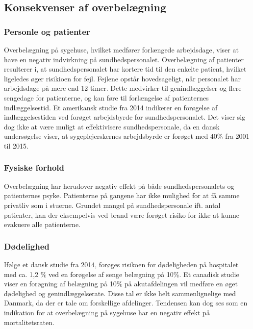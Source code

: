 \subsection{Konsekvenser af overbelægning}


\subsubsection{Personle og patienter}
Overbelægning på sygehuse, hvilket medfører forlængede arbejdsdage, viser at have en negativ indvirkning på sundhedspersonalet. \citep{Kjeldsen2015} \citep{Dinges2004} Overbelægning af patienter resulterer i, at sundhedspersonalet har kortere tid til den enkelte patient, hvilket ligeledes øger risikioen for fejl. Fejlene opstår hovedsageligt, når personalet har arbejdsdage på mere end 12 timer. \citep{Dinges2004} Dette medvirker til genindlæggelser og flere sengedage for patienterne, og kan føre til forlængelse af patienternes indlæggelsestid. Et amerikansk studie fra 2014 indikerer en forøgelse af indlæggelsestiden ved forøget arbejdsbyrde for sundhedspersonalet\citep{Elliott2014}. Det viser sig dog ikke at være muligt at effektivisere sundhedspersonale, da en dansk undersøgelse viser, at sygeplejerskernes arbejdsbyrde er forøget med 40\% fra 2001 til 2015.\citep{Kjeldsen2015}  

\subsubsection{Fysiske forhold}

Overbelægning har herudover negativ effekt på både sundhedspersonalets og patienternes psyke. Patienterne på gangene har ikke mulighed for at få samme privatliv som i stuerne.\citep{Madsen2014} Grundet mangel på sundhedspersonale ift. antal patienter, kan der eksempelvis ved brand være forøget risiko for ikke at kunne evakuere alle patienterne. \citep{Madsen2014}

\subsubsection{Dødelighed}
 Ifølge et dansk studie fra 2014, forøges risikoen for dødeligheden på hospitalet med ca. 1,2 \% ved en forøgelse af senge belægning på 10\%. \citep{Madsen2014} Et canadisk studie viser en forøgning af belægning på 10\% på akutafdelingen vil medføre en øget dødelighed og genindlæggelserate.\citep{McCusker2014} Disse tal er ikke helt sammenlignelige med Danmark, da der er tale om forskellige afdelinger. Tendensen kan dog ses som en indikation for at overbelægning på sygehuse har en negativ effekt på mortalitetsraten.